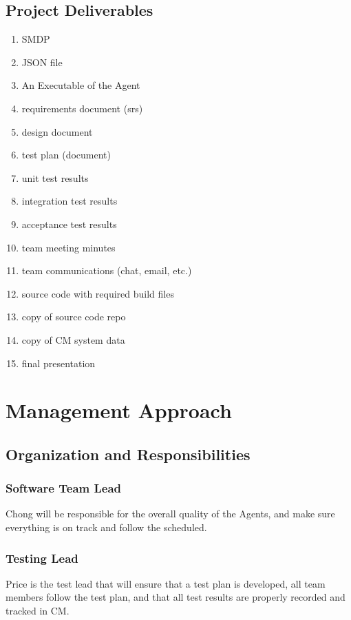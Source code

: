 \documentclass[letterpaper,12pt,oneside,listof=totoc]{scrreprt}
\begin{document}
\section{Project Deliverables}
\begin{enumerate}
\item SMDP
\item JSON file
\item An Executable of the Agent
\item requirements document (srs)
\item design document
\item test plan (document)
\item unit test results
\item integration test results
\item acceptance test results
\item team meeting minutes
\item team communications (chat, email, etc.)
\item source code with required build files
\item copy of source code repo
\item copy of CM system data
\item final presentation

\end{enumerate}


\chapter{Management Approach}

\section{Organization and Responsibilities}

\subsection{Software Team Lead} 
Chong will be responsible for the overall quality of the Agents, and make sure everything is on track and follow the scheduled. 
\subsection{Testing Lead}
Price is the test lead that will ensure that a test plan is developed, all team members follow the test plan, and that all test results are properly recorded and tracked in CM.
\end{document}
